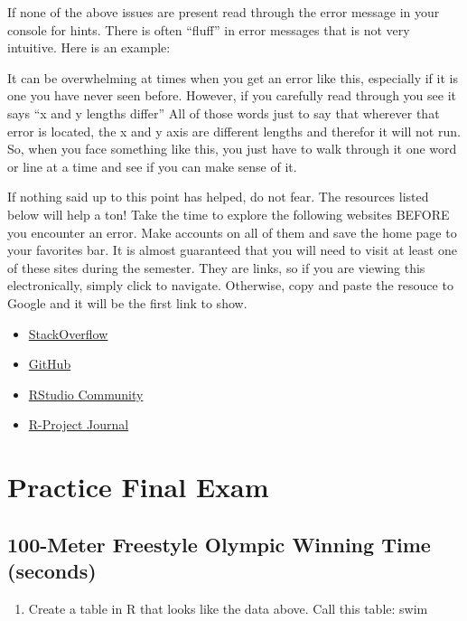 \documentclass[
]{book}
\providecommand{\tightlist}{%
  \setlength{\itemsep}{0pt}\setlength{\parskip}{0pt}}
\begin{document}
If none of the above issues are present read through the error message in your console for hints. There is often ``fluff'' in error messages that is not very intuitive. Here is an example:

It can be overwhelming at times when you get an error like this, especially if it is one you have never seen before. However, if you carefully read through you see it says ``x and y lengths differ'' All of those words just to say that wherever that error is located, the x and y axis are different lengths and therefor it will not run. So, when you face something like this, you just have to walk through it one word or line at a time and see if you can make sense of it.

If nothing said up to this point has helped, do not fear. The resources listed below will help a ton! Take the time to explore the following websites BEFORE you encounter an error. Make accounts on all of them and save the home page to your favorites bar. It is almost guaranteed that you will need to visit at least one of these sites during the semester. They are links, so if you are viewing this electronically, simply click to navigate. Otherwise, copy and paste the resouce to Google and it will be the first link to show.

\begin{itemize}
\tightlist
\item
  \href{https://stackoverflow.com/}{StackOverflow}
\item
  \href{https://github.com/}{GitHub}
\item
  \href{https://community.rstudio.com/}{RStudio Community}
\item
  \href{https://journal.r-project.org/}{R-Project Journal}
\end{itemize}

\hypertarget{practice-final-exam}{%
\chapter{Practice Final Exam}\label{practice-final-exam}}

\hypertarget{meter-freestyle-olympic-winning-time-seconds}{%
\section{100-Meter Freestyle Olympic Winning Time (seconds)}\label{meter-freestyle-olympic-winning-time-seconds}}

\begin{enumerate}
\def\labelenumi{\arabic{enumi}.}
\tightlist
\item
  Create a table in R that looks like the data above. Call this table: swim
\end{enumerate}
\end{document}
